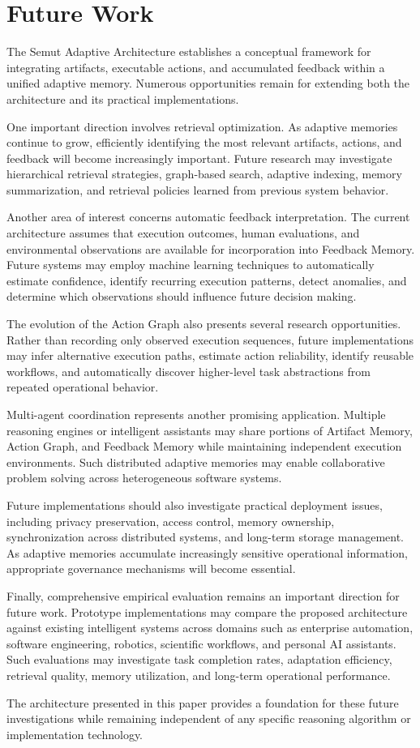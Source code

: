 \section{Future Work}
\label{sec:future-work}

The Semut Adaptive Architecture establishes a conceptual framework for integrating artifacts, executable actions, and accumulated feedback within a unified adaptive memory. Numerous opportunities remain for extending both the architecture and its practical implementations.

One important direction involves retrieval optimization. As adaptive memories continue to grow, efficiently identifying the most relevant artifacts, actions, and feedback will become increasingly important. Future research may investigate hierarchical retrieval strategies, graph-based search, adaptive indexing, memory summarization, and retrieval policies learned from previous system behavior.

Another area of interest concerns automatic feedback interpretation. The current architecture assumes that execution outcomes, human evaluations, and environmental observations are available for incorporation into Feedback Memory. Future systems may employ machine learning techniques to automatically estimate confidence, identify recurring execution patterns, detect anomalies, and determine which observations should influence future decision making.

The evolution of the Action Graph also presents several research opportunities. Rather than recording only observed execution sequences, future implementations may infer alternative execution paths, estimate action reliability, identify reusable workflows, and automatically discover higher-level task abstractions from repeated operational behavior.

Multi-agent coordination represents another promising application. Multiple reasoning engines or intelligent assistants may share portions of Artifact Memory, Action Graph, and Feedback Memory while maintaining independent execution environments. Such distributed adaptive memories may enable collaborative problem solving across heterogeneous software systems.

Future implementations should also investigate practical deployment issues, including privacy preservation, access control, memory ownership, synchronization across distributed systems, and long-term storage management. As adaptive memories accumulate increasingly sensitive operational information, appropriate governance mechanisms will become essential.

Finally, comprehensive empirical evaluation remains an important direction for future work. Prototype implementations may compare the proposed architecture against existing intelligent systems across domains such as enterprise automation, software engineering, robotics, scientific workflows, and personal AI assistants. Such evaluations may investigate task completion rates, adaptation efficiency, retrieval quality, memory utilization, and long-term operational performance.

The architecture presented in this paper provides a foundation for these future investigations while remaining independent of any specific reasoning algorithm or implementation technology.
